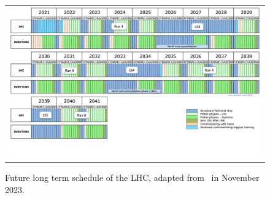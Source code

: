 \begin{figure}[tbh!]
 \begin{center}
 \begin{tabular}{c}
 \includegraphics[width=\textwidth]{figures/Part2/LHC/Schedule}
 \end{tabular}
 \caption{Future long term schedule of the \ac{LHC}, adapted from~\cite{LHC:plan} in November 2023.}
 \label{fig:Schedule}
 \end{center}
\end{figure}